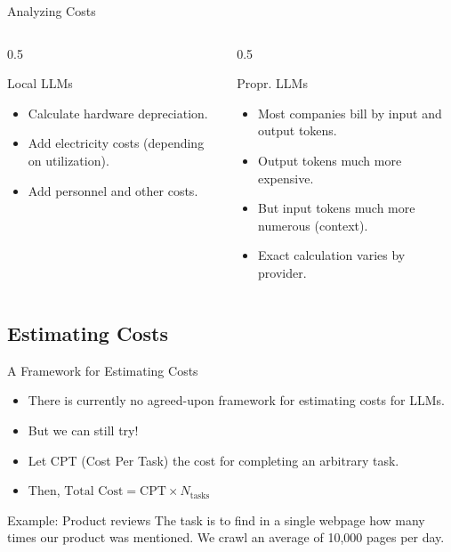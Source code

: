\documentclass[24pt]{beamer}
\newcommand{\subsectionslide}{
	 \begin{frame}
		\sectionpage
		\subsectionpage
	\end{frame}
}
\begin{document}
\begin{frame}{Analyzing Costs}
	\begin{columns}
		\begin{column}{0.5\textwidth}
			\begin{block}{Local LLMs}
				\begin{itemize}
					\item Calculate hardware depreciation.
					\item Add electricity costs (depending on utilization).
					\item Add personnel and other costs.
				\end{itemize}
			\end{block}
		\end{column}
		\begin{column}{0.5\textwidth}
			\begin{block}{Propr. LLMs}
				\begin{itemize}
					\item Most companies bill by \alert{input} and \alert{output} tokens.
					\item Output tokens much more \alert{expensive}.
					\item But input tokens much more \alert{numerous} (context).
					\item Exact calculation varies by provider.
				\end{itemize}
			\end{block}
		\end{column}
	\end{columns}
\end{frame}


\subsection{Estimating Costs}
\subsectionslide

\begin{frame}{A Framework for Estimating Costs}
	\begin{itemize}
		\item There is currently no agreed-upon framework for estimating costs for LLMs.
		\item But we can still try!
		\item Let CPT (Cost Per Task) the cost for completing an arbitrary task.
		\item Then, $\text{Total Cost} = \text{CPT}  \times N_{\text{tasks}}$
	\end{itemize}
	
	\begin{exampleblock}{Example: Product reviews}
		The task is to find in a single webpage how many times our product was mentioned.
		We crawl an average of 10{,}000 pages per day.
	\end{exampleblock}
\end{frame}
\end{document}
